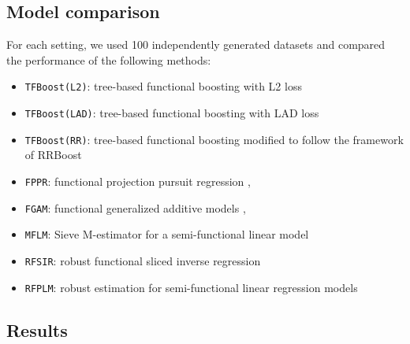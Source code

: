 \documentclass{article}
\begin{document}
\subsection{Model comparison}
For each setting, we used 100 independently generated datasets and compared the performance of the following methods: 

\begin{itemize}
 \setlength\itemsep{0.1em}
\item  \texttt{TFBoost(L2)}:  tree-based functional boosting with L2 loss
\item  \texttt{TFBoost(LAD)}:  tree-based functional boosting with LAD loss
\item  \texttt{TFBoost(RR)}:  tree-based functional boosting modified to follow the framework of RRBoost
\item \texttt{FPPR}: functional projection pursuit regression \citep{ferraty2013functional},
\item \texttt{FGAM}: functional generalized additive models \citep{mclean2014functional}, 
\item \texttt{MFLM}: Sieve M-estimator for a semi-functional linear model \cite{huang2015sieve}
\item \texttt{RFSIR}: robust functional sliced inverse regression \citep{wang2017robust}
\item \texttt{RFPLM}: robust estimation for semi-functional linear regression models \citep{boente2020robust}
\end{itemize}

\subsection{Results}

\end{document}
